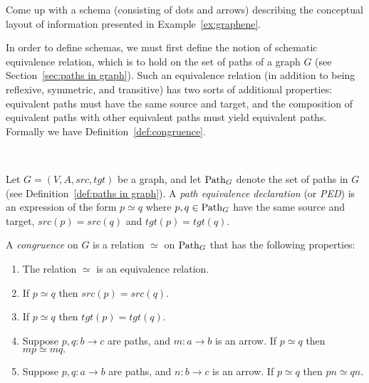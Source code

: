 \documentclass[../main/CT4S-EN-RU]{subfiles}
\begin{document}
\begin{exampleRUS}\label{ex:department store 3}
\end{exampleRUS}

\begin{exerciseENG}\label{exc:schema for first tables}
Come up with a schema (consisting of dots and arrows) describing the conceptual layout of information presented in Example~\ref{ex:graphene}. 
\end{exerciseENG}

\begin{exerciseRUS}\label{exc:schema for first tables}
\end{exerciseRUS}

\begin{blockENG}
In order to define schemas, we must first define the notion of schematic equivalence relation, which is to hold on the set of paths of a graph $G$ (see Section~\ref{sec:paths in graph}). Such an equivalence relation (in addition to being reflexive, symmetric, and transitive) has two sorts of additional properties: equivalent paths must have the same source and target, and the composition of equivalent paths with other equivalent paths must yield equivalent paths. Formally we have Definition~\ref{def:congruence}.
\end{blockENG}

\begin{blockRUS}
\end{blockRUS}

\begin{definitionENG}\label{def:congruence}\

Let $G=(V,A,src,tgt)$ be a graph, and let $\operatorname{Path}_G$ denote the set of paths in $G$ (see Definition~\ref{def:paths in graph}). A {\em path equivalence declaration} (or {\em PED}) is an expression of the form $p\simeq q$ where $p,q\in\operatorname{Path}_G$ have the same source and target, $src(p)=src(q)$ and $tgt(p)=tgt(q).$ 

A {\em congruence} on $G$ is a relation $\simeq$ on $\operatorname{Path}_G$ that has the following properties: 
\begin{enumerate}
\item The relation $\simeq$ is an equivalence relation.
\item If $p\simeq q$ then $src(p)=src(q).$
\item If $p\simeq q$ then $tgt(p)=tgt(q).$
\item Suppose $p,q\colon b{→} c$ are paths, and $m\colon a{→} b$ is an arrow. If $p\simeq q$ then $mp\simeq mq.$ 
\item Suppose $p,q\colon a{→} b$ are paths, and $n\colon b{→} c$ is an arrow. If $p\simeq q$ then $pn\simeq qn.$
\end{enumerate}
\end{definitionENG}
\end{document}
